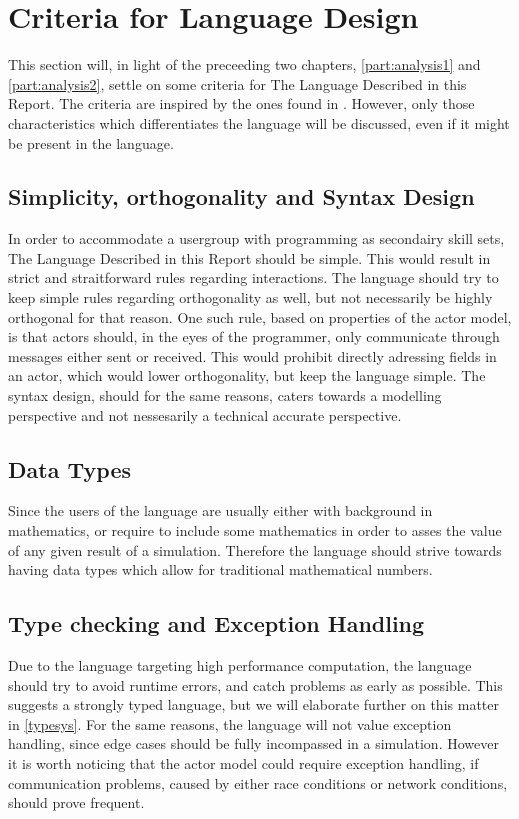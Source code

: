 \section{Criteria for Language Design}\label{analsum}

This section will, in light of the preceeding two chapters, \cref{part:analysis1} and \cref{part:analysis2}, settle on some criteria for The Language Described in this Report. The criteria are inspired by the ones found in . However, only those characteristics which differentiates the language will be discussed, even if it might be present in the language.


\subsection{Simplicity, orthogonality and Syntax Design}

In order to accommodate a usergroup with programming as secondairy skill sets, The Language Described in this Report should be simple. This would result in strict and straitforward rules regarding interactions. The language should try to keep simple rules regarding orthogonality as well, but not necessarily be highly orthogonal for that reason. One such rule, based on properties of the actor model, is that actors should, in the eyes of the programmer, only communicate through messages either sent or received. This would prohibit directly adressing fields in an actor, which would lower orthogonality, but keep the language simple. The syntax design, should for the same reasons, caters towards a modelling perspective and not nessesarily a technical accurate perspective.


\subsection{Data Types}

Since the users of the language are usually either with background in mathematics, or require to include some mathematics in order to asses the value of any given result of a simulation. Therefore the language should strive towards having data types which allow for traditional mathematical numbers.


\subsection{Type checking and Exception Handling}

Due to the language targeting high performance computation, the language should try to avoid runtime errors, and catch problems as early as possible. This suggests a strongly typed language, but we will elaborate further on this matter in \cref{typesys}. For the same reasons, the language will not value exception handling, since edge cases should be fully incompassed in a simulation. However it is worth noticing that the actor model could require exception handling, if communication problems, caused by either race conditions or network conditions, should prove frequent.





